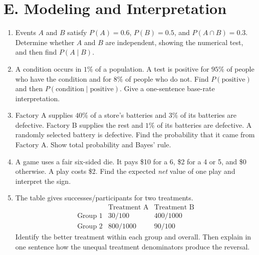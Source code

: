 \section*{E. Modeling and Interpretation}

\begin{enumerate}[label=\textbf{E.\arabic*.}]
    \item Events $A$ and $B$ satisfy $P(A)=0.6$, $P(B)=0.5$, and
    $P(A\cap B)=0.3$. Determine whether $A$ and $B$ are independent, showing
    the numerical test, and then find $P(A\mid B)$.

    \item A condition occurs in $1\%$ of a population. A test is positive for
    $95\%$ of people who have the condition and for $8\%$ of people who do not.
    Find $P(\text{positive})$ and then
    $P(\text{condition}\mid\text{positive})$. Give a one-sentence base-rate
    interpretation.

    \item Factory A supplies $40\%$ of a store's batteries and $3\%$ of its
    batteries are defective. Factory B supplies the rest and $1\%$ of its
    batteries are defective. A randomly selected battery is defective. Find the
    probability that it came from Factory A. Show total probability and Bayes'
    rule.

    \item A game uses a fair six-sided die. It pays \$10 for a 6, \$2 for a 4
    or 5, and \$0 otherwise. A play costs \$2. Find the expected \emph{net}
    value of one play and interpret the sign.

    \item The table gives successes/participants for two treatments.
    \[
    \begin{array}{c|cc}
      &\text{Treatment A}&\text{Treatment B}\\\hline
      \text{Group 1}&30/100&400/1000\\
      \text{Group 2}&800/1000&90/100
    \end{array}
    \]
    Identify the better treatment within each group and overall. Then explain in
    one sentence how the unequal treatment denominators produce the reversal.
\end{enumerate}
